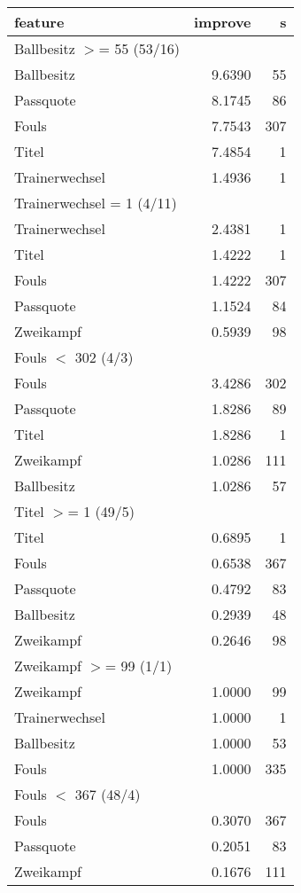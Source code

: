 \begin{table}[ht]
\centering
\begin{tabular}{lrr}
  \hline
feature & improve & s \\ 
  \hline
Ballbesitz $>$= 55 (53/16) &  &  \\ 
  Ballbesitz & 9.6390 & 55 \\ 
  Passquote & 8.1745 & 86 \\ 
  Fouls & 7.7543 & 307 \\ 
  Titel & 7.4854 & 1 \\ 
  Trainerwechsel & 1.4936 & 1 \\ 
  Trainerwechsel = 1 (4/11) &  &  \\ 
  Trainerwechsel & 2.4381 & 1 \\ 
  Titel & 1.4222 & 1 \\ 
  Fouls & 1.4222 & 307 \\ 
  Passquote & 1.1524 & 84 \\ 
  Zweikampf & 0.5939 & 98 \\ 
  Fouls $<$ 302 (4/3) &  &  \\ 
  Fouls & 3.4286 & 302 \\ 
  Passquote & 1.8286 & 89 \\ 
  Titel & 1.8286 & 1 \\ 
  Zweikampf & 1.0286 & 111 \\ 
  Ballbesitz & 1.0286 & 57 \\ 
  Titel $>$= 1 (49/5) &  &  \\ 
  Titel & 0.6895 & 1 \\ 
  Fouls & 0.6538 & 367 \\ 
  Passquote & 0.4792 & 83 \\ 
  Ballbesitz & 0.2939 & 48 \\ 
  Zweikampf & 0.2646 & 98 \\ 
  Zweikampf $>$= 99 (1/1) &  &  \\ 
  Zweikampf & 1.0000 & 99 \\ 
  Trainerwechsel & 1.0000 & 1 \\ 
  Ballbesitz & 1.0000 & 53 \\ 
  Fouls & 1.0000 & 335 \\ 
  Fouls $<$ 367 (48/4) &  &  \\ 
  Fouls & 0.3070 & 367 \\ 
  Passquote & 0.2051 & 83 \\ 
  Zweikampf & 0.1676 & 111 \\ 

\end{tabular}
\end{table}
